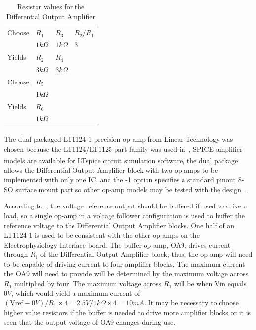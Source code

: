 \renewcommand{\arraystretch}{1.3}
\begin{table}[h]
\centering 
\begin{tabular}{l l l l}
\hline
Choose	& $R_1$	& $R_3$ & $R_2/R_1$	\\
	&	$1\unit{k\Omega}$	&  $1\unit{k\Omega}$ &	$3$	\\
Yields	& $R_2$ &  $R_4$ &	\\
	&	$3\unit{k\Omega}$	& $3\unit{k\Omega}$ &	\\
\hline
Choose	& $R_5$ &	&	\\
	&	$1\unit{k\Omega}$	& 	&	\\
Yields	& $R_6$ &  & 	\\
	&	$1\unit{k\Omega}$	&	&	\\
\hline
\end{tabular}
\caption{Resistor values for the Differential Output Amplifier\label{tab:DiffOutAmpRes} }

\end{table}
\renewcommand{\arraystretch}{1.0}

The dual packaged LT1124-1 precision op-amp from Linear Technology\textsuperscript{\textregistered} was chosen because the LT1124/LT1125 part family was used in~\cite{StahlMSEE,BatzerCorsiCrampton}, SPICE amplifier models are available for LTspice\textsuperscript{\textregistered} circuit simulation software, the dual package allows the Differential Output Amplifier block with two op-amps to be implemented with only one IC, and the -1 option specifies a standard pinout 8-SO surface mount part so other op-amp models may be tested with the design~\cite{LT11245ds}.

According to~\cite{AD5678ds}, the voltage reference output should be buffered if used to drive a load, so a single op-amp in a voltage follower configuration is used to buffer the reference voltage to the Differential Output Amplifier blocks.  One half of an LT1124-1 is used to be consistent with the other op-amps on the Electrophysiology Interface board.  The buffer op-amp, OA9, drives current through $R_1$ of the Differential Output Amplifier block; thus, the op-amp will need to be capable of driving current to four amplifier blocks.  The maximum current the OA9 will need to provide will be determined by the maximum voltage across $R_1$ multiplied by four.  The maximum voltage across $R_1$ will be when Vin equals $0\unit{V}$, which would yield a maximum current of $(\mathrm{Vref}-0\unit{V})/R_1\times4=2.5\unit{V}/1\unit{k\Omega} \times4=10\unit{mA}$.  It may be necessary to choose higher value resistors if the buffer is needed to drive more amplifier blocks or it is seen that the output voltage of OA9 changes during use.

